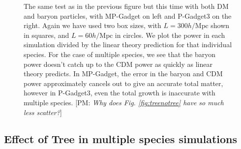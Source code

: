\documentclass[]{article}
\def\pvm#1{[PM: {\it #1}] }
\begin{document}
\begin{figure}[h]
	\caption{The same test as in the previous figure but this time with both DM and baryon particles, with MP-Gadget on left and
P-Gadget3 on the right. Again we have used two box sizes, with $L=300h/\mathrm{Mpc}$ shown in squares,
and $L=60h/\mathrm{Mpc}$ in circles. We plot the power in each simulation divided by the linear theory
prediction for that individual species. For the case of multiple species, we see that the baryon power doesn't catch up to the CDM power as quickly as linear theory predicts. In MP-Gadget, the error in the baryon and CDM power approximately cancels out to give an accurate total matter, however in P-Gadget3, even the total growth is inaccurate with multiple species.
\pvm{Why does Fig. \ref{fig:treenotree} have so much less scatter?}}
\end{figure}

\clearpage

\subsection{Effect of Tree in multiple species simulations}
\end{document}
